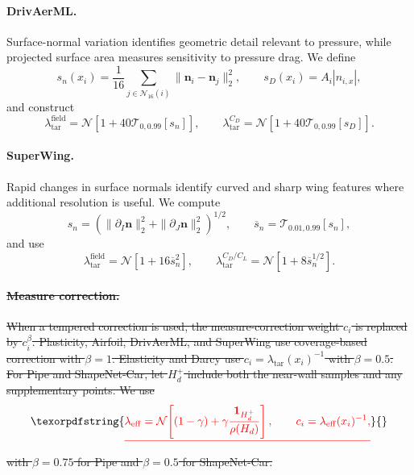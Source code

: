 \documentclass{article}
\providecommand{\DIFdeltex}[1]{{\protect\color{red}\sout{#1}}}                      %
\providecommand{\DIFdelbegin}{} %
\providecommand{\DIFdel}[1]{\texorpdfstring{\DIFdeltex{#1}}{}} %
\newcommand{\DIFscaledelfig}{0.5}
\newlength{\DIFdelgraphicswidth} %
\newlength{\DIFdelgraphicsheight} %
\newcommand{\DIFdelincludegraphics}[2][]{%
\sbox{\DIFdelgraphicsbox}{\DIFOincludegraphics[#1]{#2}}%
\settoboxwidth{\DIFdelgraphicswidth}{\DIFdelgraphicsbox} %
\settoboxtotalheight{\DIFdelgraphicsheight}{\DIFdelgraphicsbox} %
\scalebox{\DIFscaledelfig}{%
\parbox[b]{\DIFdelgraphicswidth}{\usebox{\DIFdelgraphicsbox}\\[-\baselineskip] \rule{\DIFdelgraphicswidth}{0em}}\llap{\resizebox{\DIFdelgraphicswidth}{\DIFdelgraphicsheight}{%
\setlength{\unitlength}{\DIFdelgraphicswidth}%
\begin{picture}(1,1)%
\thicklines\linethickness{2pt} %
{\color[rgb]{1,0,0}\put(0,0){\framebox(1,1){}}}%
{\color[rgb]{1,0,0}\put(0,0){\line( 1,1){1}}}%
{\color[rgb]{1,0,0}\put(0,1){\line(1,-1){1}}}%
\end{picture}%
}\hspace*{3pt}}} %
} %
\DeclareRobustCommand{\DIFdelbegin}{\DIFOdelbegin \let\includegraphics\DIFdelincludegraphics} %
\begin{document}
\paragraph{DrivAerML.}
Surface-normal variation identifies geometric detail relevant to pressure,
while projected surface area measures sensitivity to pressure drag. We define
\[
    s_n(x_i)
    =\frac{1}{16}
      \sum_{j\in\mathcal{N}_{16}(i)}
      \|\mathbf n_i-\mathbf n_j\|_2^2,
    \qquad
    s_D(x_i)=A_i|n_{i,x}|,
\]
and construct
\begin{equation}
    \lambda_{\mathrm{tar}}^{\mathrm{field}}
    =\mathcal{N}\!\left[
        1+40\mathcal{T}_{0,0.99}[s_n]
    \right],
    \qquad
    \lambda_{\mathrm{tar}}^{C_D}
    =\mathcal{N}\!\left[
        1+40\mathcal{T}_{0,0.99}[s_D]
    \right].
    \label{eq:app_pi_drivaerml_density}
\end{equation}

\paragraph{SuperWing.}
Rapid changes in surface normals identify curved and sharp wing features where
additional resolution is useful. We compute
\[
    s_n
    =
    \left(
        \|\partial_I\mathbf n\|_2^2
        +\|\partial_J\mathbf n\|_2^2
    \right)^{1/2},
    \qquad
    \overline{s}_n
    =\mathcal{T}_{0.01,0.99}[s_n],
\]
and use
\begin{equation}
    \lambda_{\mathrm{tar}}^{\mathrm{field}}
    =\mathcal{N}[1+16\overline{s}_n^2],
    \qquad
    \lambda_{\mathrm{tar}}^{C_D/C_L}
    =\mathcal{N}[1+8\overline{s}_n^{1/2}].
    \label{eq:app_pi_superwing_density}
\end{equation}

\DIFdelbegin \paragraph{\DIFdel{Measure correction.}}
\addtocounter{paragraph}{-1}%
\DIFdel{When a tempered correction is used, the measure-correction weight $c_i$ is
replaced by $c_i^\beta$. Plasticity, Airfoil, DrivAerML, and SuperWing use
coverage-based correction with $\beta=1$. Elasticity and Darcy use
$c_i=\lambda_{\mathrm{tar}}(x_i)^{-1}$ with $\beta=0.5$.
For Pipe and ShapeNet-Car, let $H_d^+$ include both the near-wall samples and
any supplementary points. We use
}\[
    \DIFdel{\lambda_{\mathrm{eff}}
    =\mathcal{N}\!\left[
        (1-\gamma)
        +\gamma\frac{\mathbf{1}_{H_d^+}}{\rho(H_d)}
    \right],
    \qquad
    c_i=\lambda_{\mathrm{eff}}(x_i)^{-1},
}\]%
\DIFdel{with $\beta=0.75$ for Pipe and $\beta=0.5$ for ShapeNet-Car.
}%
\end{document}
